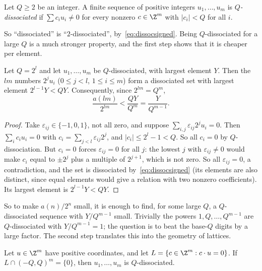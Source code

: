 \begin{definition}
Let $Q\ge2$ be an integer. A finite sequence of positive integers $u_1,\dots,u_m$ is \emph{$Q$-dissociated} if $\sum c_iu_i\neq0$ for every
nonzero $c\in\Z^m$ with $|c_i|<Q$ for all $i$.
\end{definition}

So ``dissociated'' is ``$2$-dissociated'', by~\eqref{eq:dissocsigned}. Being $Q$-dissociated for a large $Q$ is a much stronger property, and the first step
shows that it is cheaper per element.

\begin{proposition}\label{prop:qdissoc}
Let $Q=2^l$ and let $u_1,\dots,u_m$ be $Q$-dissociated, with largest element $Y$. Then the $lm$ numbers $2^ju_i$ ($0\le j<l$, $1\le i\le m$) form a
dissociated set with largest element $2^{l-1}Y<QY$. Consequently, since $2^{lm}=Q^m$,
\[
\frac{a(lm)}{2^{lm}}<\frac{QY}{Q^m}=\frac Y{Q^{m-1}}.
\]
\end{proposition}

\begin{proof}
Take $\varepsilon_{ij}\in\{-1,0,1\}$, not all zero, and suppose $\sum_{i,j}\varepsilon_{ij}2^ju_i=0$. Then $\sum_ic_iu_i=0$ with $c_i=\sum_{j<l}\varepsilon_{ij}2^j$, and
$|c_i|\le2^l-1<Q$. So all $c_i=0$ by $Q$-dissociation. But $c_i=0$ forces $\varepsilon_{ij}=0$ for all $j$: the lowest $j$ with $\varepsilon_{ij}\ne0$ would make $c_i$ equal to
$\pm2^j$ plus a multiple of $2^{j+1}$, which is not zero. So all $\varepsilon_{ij}=0$, a contradiction, and the set is dissociated by~\eqref{eq:dissocsigned} (its
elements are also distinct, since equal elements would give a relation with two nonzero coefficients). Its largest element is $2^{l-1}Y<QY$.
\end{proof}

So to make $a(n)/2^n$ small, it is enough to find, for some large $Q$, a $Q$-dissociated sequence with $Y/Q^{m-1}$ small. Trivially the powers
$1,Q,\dots,Q^{m-1}$ are $Q$-dissociated with $Y/Q^{m-1}=1$; the question is to beat the base-$Q$ digits by a large factor. The second step
translates this into the geometry of lattices.

\begin{proposition}\label{prop:latticeq}
Let $u\in\Z^m$ have positive coordinates, and let $L=\{c\in\Z^m:c\cdot u=0\}$. If $L\cap(-Q,Q)^m=\{0\}$, then $u_1,\dots,u_m$ is $Q$-dissociated.
\end{proposition}

